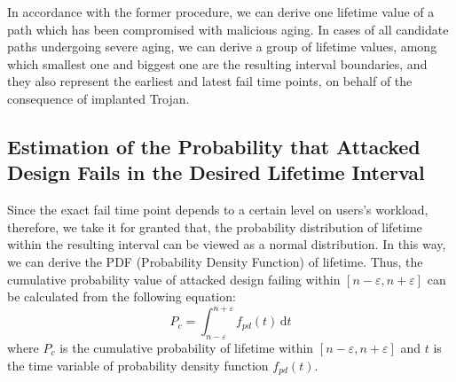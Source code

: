 In accordance with the former procedure, we can derive one lifetime value of a path which has been compromised with malicious aging. In cases of all candidate paths undergoing severe aging, we can derive a group of lifetime values, among which smallest one and biggest one are the resulting interval boundaries, and they also represent the earliest and latest fail time points, on behalf of the consequence of implanted Trojan.

\subsection{Estimation of the Probability that Attacked Design Fails in the Desired Lifetime Interval}
Since the exact fail time point depends to a certain level on users's workload, therefore, we take it for granted that, the probability distribution of lifetime within the resulting interval can be viewed as a normal distribution. In this way, we can derive the PDF (Probability Density Function) of lifetime. Thus, the cumulative probability value of attacked design failing within $[n-\varepsilon, n+\varepsilon]$ can be calculated from the following equation:
\begin{equation}
	\label{eq:pdf}
		P_{c} = \int_{n-\varepsilon}^{n+\varepsilon} f_{pd}(t) \,\mathrm{d}t
\end{equation}
where $P_{c}$ is the cumulative probability of lifetime within $[n-\varepsilon, n+\varepsilon]$ and $t$ is the time variable of probability density function $f_{pd}(t)$.

  
